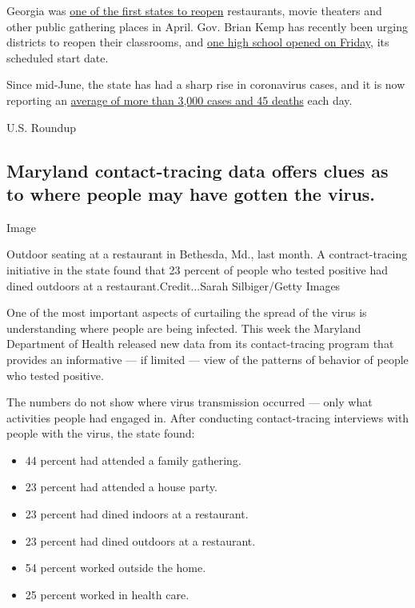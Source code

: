 Georgia was
\href{https://www.nytimes.com/2020/04/20/us/coronavirus-us-hot-spots-reopening.html}{one
of the first states to reopen} restaurants, movie theaters and other
public gathering places in April. Gov. Brian Kemp has recently been
urging districts to reopen their classrooms, and
\href{https://www.nytimes.com/2020/07/27/us/covid-georgia-schools-masks.html}{one
high school opened on Friday}, its scheduled start date.

Since mid-June, the state has had a sharp rise in coronavirus cases, and
it is now reporting an
\href{https://www.nytimes.com/interactive/2020/us/georgia-coronavirus-cases.html}{average
of more than 3,000 cases and 45 deaths} each day.

U.S. Roundup

\hypertarget{maryland-contact-tracing-data-offers-clues-as-to-where-people-may-have-gotten-the-virus}{%
\subsection{Maryland contact-tracing data offers clues as to where
people may have gotten the
virus.}\label{maryland-contact-tracing-data-offers-clues-as-to-where-people-may-have-gotten-the-virus}}

Image

Outdoor seating at a restaurant in Bethesda, Md., last month. A
contract-tracing initiative in the state found that 23 percent of people
who tested positive had dined outdoors at a restaurant.Credit...Sarah
Silbiger/Getty Images

One of the most important aspects of curtailing the spread of the virus
is understanding where people are being infected. This week the Maryland
Department of Health released new data from its contact-tracing program
that provides an informative --- if limited --- view of the patterns of
behavior of people who tested positive.

The numbers do not show where virus transmission occurred --- only what
activities people had engaged in. After conducting contact-tracing
interviews with people with the virus, the state found:

\begin{itemize}
\item
  44 percent had attended a family gathering.
\item
  23 percent had attended a house party.
\item
  23 percent had dined indoors at a restaurant.
\item
  23 percent had dined outdoors at a restaurant.
\item
  54 percent worked outside the home.
\item
  25 percent worked in health care.
\end{itemize}

